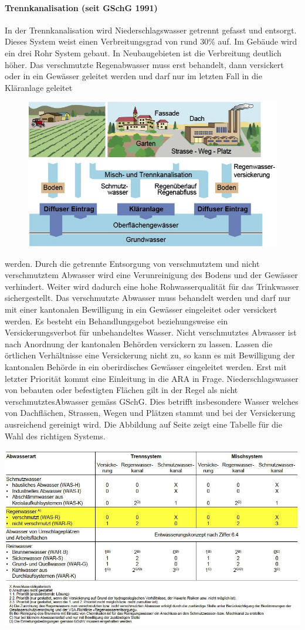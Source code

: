 \documentclass[9pt, openright=false]{scrartcl}
\begin{document}
\paragraph{Trennkanalisation (seit GSchG 1991)} In der Trennkanalisation wird Niederschlagswasser getrennt gefasst und entsorgt. Dieses System weist einen Verbreitungsgrad von rund 30\% auf. Im Gebäude wird ein drei Rohr System gebaut. In Neubaugebieten ist die Verbreitung deutlich höher. Das verschmutzte Regenabwasser muss erst behandelt, dann versickert oder in ein Gewässer geleitet werden und darf nur im letzten Fall in die Kläranlage geleitet\begin{figure} 
  \includegraphics[width=.5\textwidth]{images/uebersicht}
\end{figure} werden. Durch die getrennte Entsorgung von verschmutztem und nicht verschmutztem Abwasser wird eine Verunreinigung des Bodens und der Gewässer verhindert. Weiter wird dadurch eine hohe Rohwasserqualität für das Trinkwasser sichergestellt. Das verschmutzte Abwasser muss behandelt werden und darf nur mit einer kantonalen Bewilligung in ein Gewässer eingeleitet oder versickert werden. Es besteht ein Behandlungsgebot beziehungsweise ein Versickerungsverbot für unbehandeltes Wasser. Nicht verschmutztes Abwasser ist nach Anordnung der kantonalen Behörden versickern zu lassen. Lassen die örtlichen Verhältnisse eine Versickerung nicht zu, so kann es mit Bewilligung der kantonalen Behörde in ein oberirdisches Gewässer eingeleitet werden. Erst mit letzter Priorität kommt eine Einleitung in die ARA in Frage. Niederschlagswasser von bebauten oder befestigten Flächen gilt in der Regel als \glqq nicht verschmutztes\grqq  Abwasser gemäss GSchG. Dies betrifft insbesondere Wasser welches von Dachflächen, Strassen, Wegen und Plätzen stammt und bei der Versickerung ausreichend gereinigt wird. Die Abbildung auf Seite \pageref{Entwaesserungssystem} zeigt eine Tabelle für die Wahl des richtigen Systems.
\begin{center}
\includegraphics[width=\textwidth]{images/EntscheidEntwaesserung}
\label{Entwaesserungssystem}
\end{center}
\end{document}
